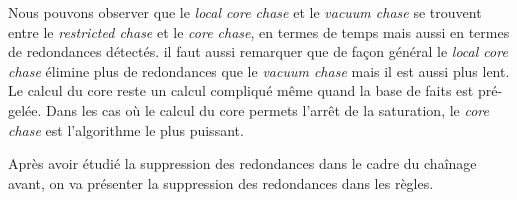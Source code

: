 Nous pouvons observer que le \textit{local core chase} et le \textit{vacuum chase} se trouvent entre le \textit{restricted chase} et le \textit{core chase}, en termes de temps mais aussi en termes de redondances détectés. il faut aussi remarquer que de façon général le \textit{local core chase} élimine plus de redondances que le \textit{vacuum chase} mais il est aussi plus lent. Le calcul du core reste un calcul compliqué même quand la base de faits est pré-gelée. Dans les cas où le calcul du core permets l'arrêt de la saturation, le \textit{core chase} est l'algorithme le plus puissant.

\par Après avoir étudié la suppression des redondances dans le cadre du chaînage avant, on va présenter la suppression des redondances dans les règles.